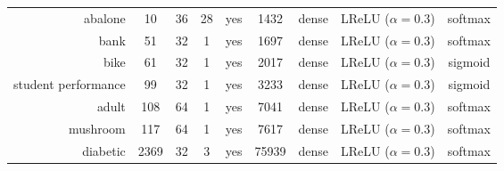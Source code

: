 \begin{table}[H]
{\begin{tabular}{rcccccccc}
			abalone             & 10              & 36              & 28              & yes             & 1432                & dense             & LReLU ($\alpha = 0.3$) & softmax                \\
			bank                & 51              & 32              & 1               & yes             & 1697                & dense             & LReLU ($\alpha = 0.3$) & softmax                \\
			bike                & 61              & 32              & 1               & yes             & 2017                & dense             & LReLU ($\alpha = 0.3$) & sigmoid                \\
			student performance & 99              & 32              & 1               & yes             & 3233                & dense             & LReLU ($\alpha = 0.3$) & sigmoid                \\
			adult               & 108             & 64              & 1               & yes             & 7041                & dense             & LReLU ($\alpha = 0.3$) & softmax                \\
			mushroom            & 117             & 64              & 1               & yes             & 7617                & dense             & LReLU ($\alpha = 0.3$) & softmax                \\
			diabetic            & 2369            & 32              & 3               & yes             & 75939               & dense             & LReLU ($\alpha = 0.3$) & softmax                \\
		\end{tabular}%
	}
\end{table}%

